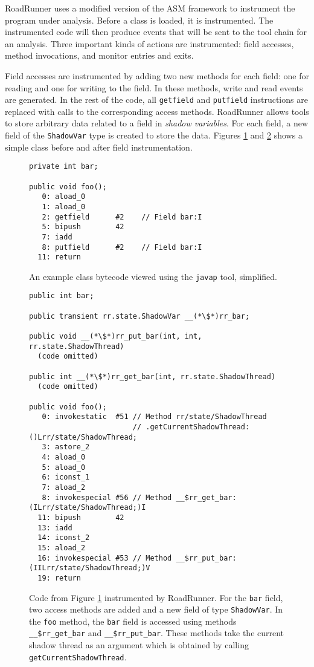 RoadRunner uses a modified version of the ASM framework to instrument the
program under analysis. Before a class is loaded, it is instrumented. The
instrumented code will then produce events that will be sent to the tool chain
for an analysis. Three important kinds of actions are instrumented: field
accesses, method invocations, and monitor entries and exits.

Field accesses are instrumented by adding two new methods for each field: one
for reading and one for writing to the field. In these methods, write and read
events are generated. In the rest of the code, all \texttt{getfield} and
\texttt{putfield} instructions are replaced with calls to the corresponding
access methods. RoadRunner allows tools to store arbitrary data related to a
field in \emph{shadow variables}. For each field, a new field of the
\texttt{ShadowVar} type is created to store the data. Figures \ref{rrInstBefore}
and \ref{rrInstField} shows a simple class before and after field
instrumentation.

\begin{figure}[hbt]
    \label{rrInstBefore}
    \begin{lstlisting}
private int bar;

public void foo();
   0: aload_0
   1: aload_0
   2: getfield      #2    // Field bar:I
   5: bipush        42
   7: iadd
   8: putfield      #2    // Field bar:I
  11: return\end{lstlisting}
    \caption{An example class bytecode viewed using the \texttt{javap} tool,
    simplified.}
\end{figure}

\begin{figure}[hbt]
    \label{rrInstField}
    \begin{lstlisting}
public int bar;

public transient rr.state.ShadowVar __(*\$*)rr_bar;

public void __(*\$*)rr_put_bar(int, int, rr.state.ShadowThread)
  (code omitted)

public int __(*\$*)rr_get_bar(int, rr.state.ShadowThread)
  (code omitted)

public void foo();
   0: invokestatic  #51 // Method rr/state/ShadowThread
                        // .getCurrentShadowThread:()Lrr/state/ShadowThread;
   3: astore_2
   4: aload_0
   5: aload_0
   6: iconst_1
   7: aload_2
   8: invokespecial #56 // Method __$rr_get_bar:(ILrr/state/ShadowThread;)I
  11: bipush        42
  13: iadd
  14: iconst_2
  15: aload_2
  16: invokespecial #53 // Method __$rr_put_bar:(IILrr/state/ShadowThread;)V
  19: return\end{lstlisting}
    \caption{Code from Figure \ref{rrInstBefore} instrumented by RoadRunner. For
    the \texttt{bar} field, two access methods are added and a new field of type
    \texttt{ShadowVar}. In the \texttt{foo} method, the \texttt{bar} field is
    accessed using methods \texttt{\_\_\$rr\_get\_bar} and
    \texttt{\_\_\$rr\_put\_bar}. These methods take the current shadow thread as
    an argument which is obtained by calling \texttt{getCurrentShadowThread}.}
\end{figure}

